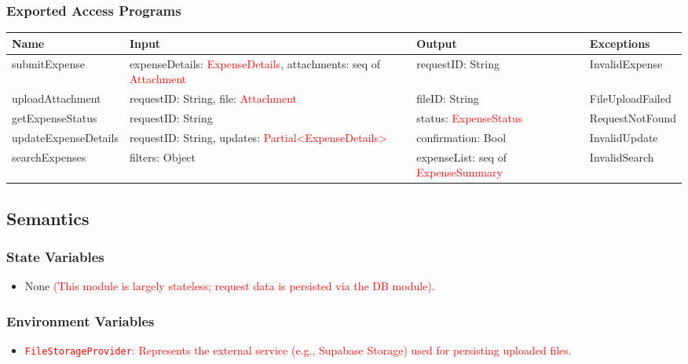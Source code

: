 \documentclass[12pt, titlepage]{article}
\begin{document}
\subsubsection{Exported Access Programs}
\begin{center}
    \scriptsize
    \begin{tabular}{|p{3cm}|p{4cm}|p{4cm}|p{4cm}|}
        \hline
        \textbf{Name} & \textbf{Input} & \textbf{Output} & \textbf{Exceptions} \\
        \hline
        submitExpense & expenseDetails: \textcolor{red}{ExpenseDetails}, attachments: seq of \textcolor{red}{Attachment} & requestID: String & InvalidExpense \\
        \hline
        uploadAttachment & requestID: String, file: \textcolor{red}{Attachment} & fileID: String & FileUploadFailed \\
        \hline
        getExpenseStatus & requestID: String & status: \textcolor{red}{ExpenseStatus} & RequestNotFound \\
        \hline
        updateExpenseDetails & requestID: String, updates: \textcolor{red}{Partial<ExpenseDetails>} & confirmation: Bool & InvalidUpdate \\
        \hline
        searchExpenses & filters: Object & expenseList: seq of \textcolor{red}{ExpenseSummary} & InvalidSearch \\
        \hline
    \end{tabular}
\end{center}

\subsection{Semantics}
\subsubsection{State Variables}
\begin{itemize}
    \item None \textcolor{red}{(This module is largely stateless; request data is persisted via the DB module).}
\end{itemize}

\subsubsection{Environment Variables}
\begin{itemize}
    \item \textcolor{red}{\texttt{FileStorageProvider}: Represents the external service (e.g., Supabase Storage) used for persisting uploaded files.}
\end{itemize}
\end{document}
